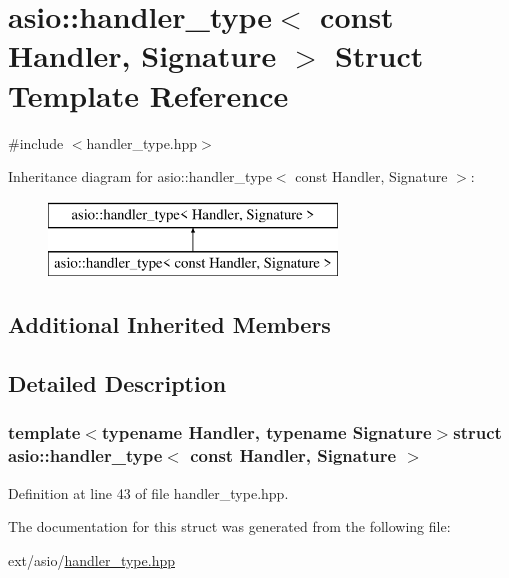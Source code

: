 \hypertarget{structasio_1_1handler__type_3_01const_01_handler_00_01_signature_01_4}{}\section{asio\+:\+:handler\+\_\+type$<$ const Handler, Signature $>$ Struct Template Reference}
\label{structasio_1_1handler__type_3_01const_01_handler_00_01_signature_01_4}


{\ttfamily \#include $<$handler\+\_\+type.\+hpp$>$}

Inheritance diagram for asio\+:\+:handler\+\_\+type$<$ const Handler, Signature $>$\+:\begin{figure}[H]
\begin{center}
\leavevmode
\includegraphics[height=2.000000cm]{structasio_1_1handler__type_3_01const_01_handler_00_01_signature_01_4}
\end{center}
\end{figure}
\subsection*{Additional Inherited Members}


\subsection{Detailed Description}
\subsubsection*{template$<$typename Handler, typename Signature$>$struct asio\+::handler\+\_\+type$<$ const Handler, Signature $>$}



Definition at line 43 of file handler\+\_\+type.\+hpp.



The documentation for this struct was generated from the following file\+:\begin{DoxyCompactItemize}
\item 
ext/asio/\hyperlink{handler__type_8hpp}{handler\+\_\+type.\+hpp}\end{DoxyCompactItemize}
